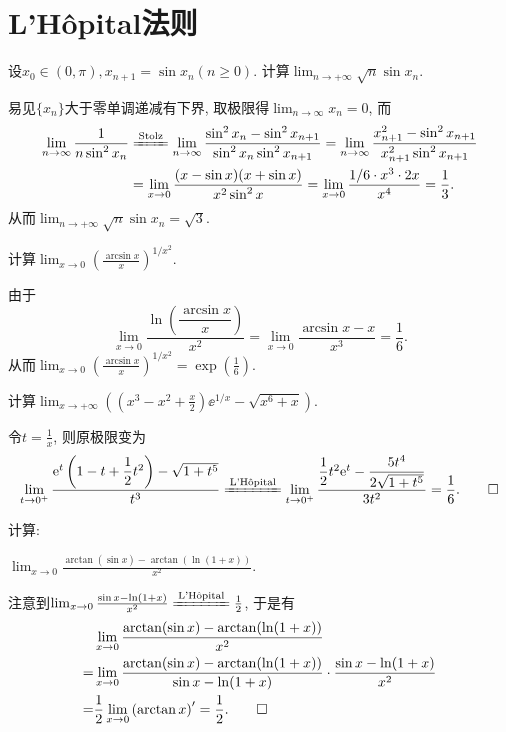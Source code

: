 \section{L'H\^{o}pital法则}
\begin{quiza}
\woe 设\(x_0\in(0,\pi),x_{n+1}=\sin x_n(n\geqslant 0).\) 计算\(\lim_{n\rightarrow+\infty}\sqrt{n}\sin x_n\).
\begin{solution}
易见\(\{x_n\}\)大于零单调递减有下界, 取极限得\(\lim_{n\rightarrow\infty}x_n=0\), 而\[\begin{split}
\lim_{n\rightarrow\infty}\frac{1}{n\sin^2 x_n}&\xlongequal{\text{Stolz}}\lim_{n\rightarrow\infty}\frac{\sin^2x_n-\sin^2x_{n+1}}{\sin^2x_n\sin^2x_{n+1}}=\lim_{n\rightarrow\infty}\frac{x_{n+1}^2-\sin^2x_{n+1}}{x_{n+1}^2\sin^2x_{n+1}}\\&=\lim_{x\rightarrow 0}\frac{(x-\sin x)(x+\sin x)}{x^2\sin^2x}=\lim_{x\rightarrow 0}\frac{1/6\cdot x^3\cdot 2x}{x^4}=\frac{1}{3}.
\end{split}\]从而\(\lim_{n\rightarrow+\infty}\sqrt{n}\sin x_n=\sqrt{3}\).
\end{solution}
\woe 计算\(\lim_{x\rightarrow 0}\left(\frac{\arcsin x}{x}\right)^{1/x^2}\).
\begin{solution}
由于\[\lim_{x\rightarrow 0}\frac{\ln\left(\dfrac{\arcsin x}{x}\right)}{x^2}=\lim_{x\rightarrow 0}\frac{\arcsin x-x}{x^3}=\frac{1}{6}.\]从而\(\lim_{x\rightarrow 0}\left(\frac{\arcsin x}{x}\right)^{1/x^2}=\exp\left(\frac{1}{6}\right)\).
\end{solution}
\woe 计算\(\lim_{x\rightarrow+\infty}\left(\left(x^3-x^2+\frac{x}{2}\right)\ee^{1/x}-\sqrt{x^6+x}\right)\).
\begin{solution}
令\(t=\frac{1}{x}\), 则原极限变为\[\lim_{t\rightarrow0^+}\frac{\ee^t\left(1-t+\dfrac{1}{2}t^2\right)-\sqrt{1+t^5}}{t^3}\xlongequal{\text{L'H\^{o}pital}}\lim_{t\rightarrow 0^+}\frac{\dfrac{1}{2}t^2\ee^t-\dfrac{5t^4}{2\sqrt{1+t^5}}}{3t^2}=\frac{1}{6}.\qedhere\]
\end{solution}
\woe 计算:
\begin{quizs}
\item \(\lim_{x\rightarrow 0}\frac{\arctan(\sin x)-\arctan(\ln (1+x))}{x^2}\).
\begin{solution}
注意到\(\lim_{x\rightarrow 0}\frac{\sin x-\ln(1+x)}{x^2}\xlongequal{\text{L'H\^{o}pital}}\frac{1}{2}\), 于是有\[\begin{split}
&\lim_{x\rightarrow 0}\frac{\arctan(\sin x)-\arctan(\ln (1+x))}{x^2}\\=&\lim_{x\rightarrow 0}\frac{\arctan(\sin x)-\arctan(\ln (1+x))}{\sin x-\ln(1+x)}\cdot\frac{\sin x-\ln(1+x)}{x^2}\\=&\frac{1}{2}\lim_{x\rightarrow 0}\left(\arctan x\right)'=\frac{1}{2}.\qedhere

\end{split}\]
\end{solution}
\end{quizs}
\end{quiza}
